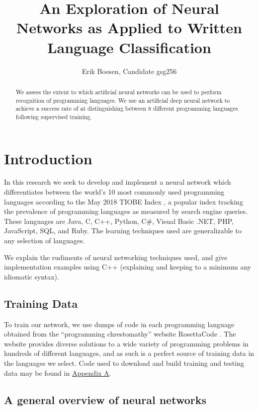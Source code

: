 \documentclass{article}
\begin{document}
\title{An Exploration of Neural Networks as Applied to Written Language Classification}
\author{Erik Boesen, Candidate gsg256}
\maketitle

\begin{abstract}
We assess the extent to which artificial neural networks can be used to perform recognition of programming languages. We use an artificial deep neural network to achieve a success rate of  at distinguishing between 8 different programming languages following supervised training.
\end{abstract}

\section{Introduction}
In this research we seek to develop and implement a neural network which differentiates between the world's 10 most commonly used programming languages according to the May 2018 TIOBE Index \cite{tiobe}, a popular index tracking the prevalence of programming languages as measured by search engine queries. These languages are Java, C, C++, Python, C\#, Visual Basic .NET, PHP, JavaScript, SQL, and Ruby. The learning techniques used are generalizable to any selection of languages.

We explain the rudiments of neural networking techniques used, and give implementation examples using C++ (explaining and keeping to a minimum any idiomatic syntax).

\subsection{Training Data}
To train our network, we use dumps of code in each programming language obtained from the ``programming chrestomathy'' website RosettaCode \cite{rosettacode}. The website provides diverse solutions to a wide variety of programming problems in hundreds of different languages, and as such is a perfect source of training data in the languages we select.  Code used to download and build training and testing data may be found in  \hyperref[sec:appendix_a]{Appendix A}.

\subsection{A general overview of neural networks}
\end{document}
